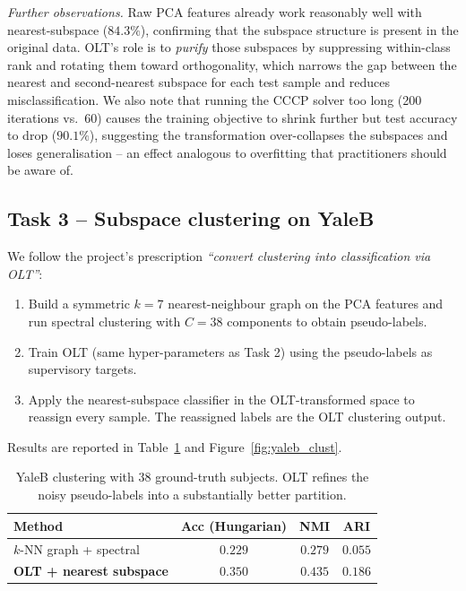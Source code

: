 \documentclass[10pt]{article}
\begin{document}
\emph{Further observations.}
Raw PCA features already work reasonably well with nearest-subspace
($84.3\%$), confirming that the subspace structure is present in the
original data. OLT's role is to \emph{purify} those subspaces by
suppressing within-class rank and rotating them toward orthogonality,
which narrows the gap between the nearest and second-nearest subspace
for each test sample and reduces misclassification. We also note that
running the CCCP solver too long (200 iterations vs.\ 60) causes the
training objective to shrink further but test accuracy to drop
($90.1\%$), suggesting the transformation over-collapses the
subspaces and loses generalisation -- an effect analogous to
overfitting that practitioners should be aware of.

\subsection{Task 3 -- Subspace clustering on YaleB}

We follow the project's prescription \emph{``convert clustering into
classification via OLT''}:
\begin{enumerate}
\item Build a symmetric $k=7$ nearest-neighbour graph on the PCA
features and run spectral clustering with $C=38$ components to obtain
pseudo-labels.
\item Train OLT (same hyper-parameters as Task 2) using the
pseudo-labels as supervisory targets.
\item Apply the nearest-subspace classifier in the OLT-transformed
space to reassign every sample. The reassigned labels are the OLT
clustering output.
\end{enumerate}
Results are reported in Table~\ref{tab:yaleb_clust} and
Figure~\ref{fig:yaleb_clust}.

\begin{table}[h]\centering
\begin{tabular}{lccc}
\toprule
Method & Acc (Hungarian) & NMI & ARI \\
\midrule
$k$-NN graph + spectral & $0.229$ & $0.279$ & $0.055$ \\
\textbf{OLT + nearest subspace} & $\mathbf{0.350}$ & $\mathbf{0.435}$ & $\mathbf{0.186}$ \\
\bottomrule
\end{tabular}
\caption{YaleB clustering with 38 ground-truth subjects. OLT refines
the noisy pseudo-labels into a substantially better partition.}
\label{tab:yaleb_clust}
\end{table}
\end{document}
